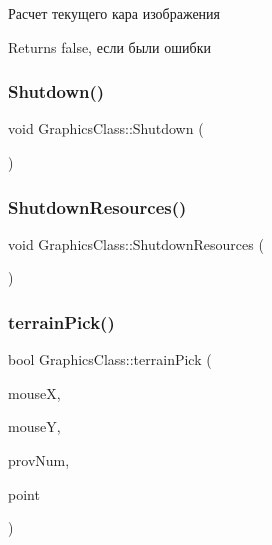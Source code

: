 Расчет текущего кара изображения 

\begin{DoxyReturn}{Returns}
false, если были ошибки 
\end{DoxyReturn}
\mbox{\label{class_graphics_class_a3f44e9b9083f1d1a5246bb0f2158b1a9}} 
\subsubsection{\texorpdfstring{Shutdown()}{Shutdown()}}
{\footnotesize\ttfamily void Graphics\+Class\+::\+Shutdown (\begin{DoxyParamCaption}{ }\end{DoxyParamCaption})}

\mbox{\label{class_graphics_class_a30ce261248e7e556eca56ad2388ca0ae}} 
\subsubsection{\texorpdfstring{Shutdown\+Resources()}{ShutdownResources()}}
{\footnotesize\ttfamily void Graphics\+Class\+::\+Shutdown\+Resources (\begin{DoxyParamCaption}{ }\end{DoxyParamCaption})}

\mbox{\label{class_graphics_class_a6ef671ab668663783ee4da691d03d9d5}} 
\subsubsection{\texorpdfstring{terrain\+Pick()}{terrainPick()}}
{\footnotesize\ttfamily bool Graphics\+Class\+::terrain\+Pick (\begin{DoxyParamCaption}\item[{int}]{mouseX,  }\item[{int}]{mouseY,  }\item[{int \&}]{prov\+Num,  }\item[{D3\+D\+X\+V\+E\+C\+T\+O\+R3 \&}]{point }\end{DoxyParamCaption})\hspace{0.3cm}{\ttfamily [private]}}

